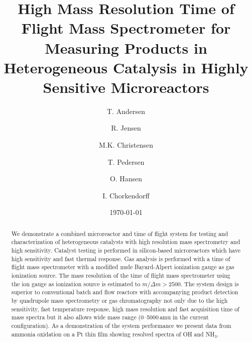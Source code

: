 \documentclass[aip,rsi]{revtex4-1}
\begin{document}

\title{High Mass Resolution Time of Flight Mass Spectrometer for Measuring Products in Heterogeneous Catalysis in Highly Sensitive Microreactors} %



\author{T. Andersen}
\author{R. Jensen}
\author{M.K. Christensen}
\author{T. Pedersen}
\author{O. Hansen}
\author{I. Chorkendorff}


\date{\today}

\begin{abstract}
We demonstrate a combined microreactor and time of flight system for testing and characterization of heterogeneous catalysts with high resolution mass spectrometry and high sensitivity. Catalyst testing is performed in silicon-based microreactors which have high sensitivity and fast thermal response. Gas analysis is performed with a time of flight mass spectrometer with a modified nude Bayard-Alpert ionization gauge as gas ionization source. The mass resolution of the time of flight mass spectrometer using the ion gauge as ionization source is estimated to $m/\Delta m>2500$. The system design is superior to conventional batch and flow reactors with accompanying product detection by quadrupole mass spectrometry or gas chromatography not only due to the high sensitivity, fast temperature response, high mass resolution and fast acquisition time of mass spectra but it also allows wide mass range (\mbox{0--5000}\,amu in the current configuration). As a demonstration of the system performance we present data from ammonia oxidation on a Pt thin film showing resolved spectra of OH and NH$_{3}$.
\end{abstract}
\end{document}
